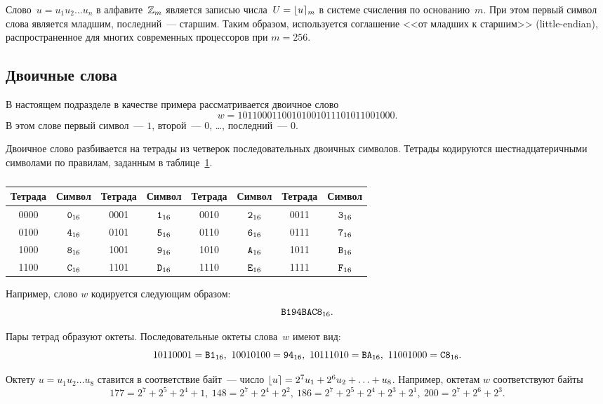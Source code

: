 Слово~$u=u_1 u_2\ldots u_n$ в алфавите~$\mathbb{Z}_m$ является записью 
числа~$U=\lfloor u\rceil_m$ в системе счисления по основанию~$m$. 
При этом первый символ слова является младшим, последний~--- старшим.
%
Таким образом, используется соглашение <<от младших к старшим>> 
(little-endian), распространенное для многих современных процессоров при 
$m=256$. 

\subsection{Двоичные слова}\label{DEFS.BinWords}

В настоящем подразделе в качестве примера рассматривается двоичное слово
$$
w=1011 0001 1001 0100 1011 1010 1100 1000.
$$
В этом слове первый символ~--- $1$, 
второй~--- $0$, \ldots, последний~--- $0$.

Двоичное слово разбивается на тетрады из четверок последовательных 
двоичных символов. 
%
Тетрады кодируются шестнадцатеричными символами по правилам, заданным в 
таблице~\ref{Table.Hex}.

\begin{table}[H]
\caption{}\label{Table.Hex}
\begin{tabular}{|c|c||c|c||c|c||c|c|}
\hline
Тетрада & Символ & Тетрада & Символ & Тетрада & Символ & Тетрада & Символ\\
\hline
0000 & $\texttt{0}_{16}$ & 0001 & $\texttt{1}_{16}$ & 
0010 & $\texttt{2}_{16}$ & 0011 & $\texttt{3}_{16}$\\
0100 & $\texttt{4}_{16}$ & 0101 & $\texttt{5}_{16}$ & 
0110 & $\texttt{6}_{16}$ & 0111 & $\texttt{7}_{16}$\\ 
1000 & $\texttt{8}_{16}$ & 1001 & $\texttt{9}_{16}$ & 
1010 & $\texttt{A}_{16}$ & 1011 & $\texttt{B}_{16}$\\ 
1100 & $\texttt{C}_{16}$ & 1101 & $\texttt{D}_{16}$ & 
1110 & $\texttt{E}_{16}$ & 1111 & $\texttt{F}_{16}$\\ 
\hline
\end{tabular}
\end{table}

Например, слово $w$ кодируется следующим образом:
$$
\texttt{B194BAC8}_{16}.
$$

Пары тетрад образуют октеты. Последовательные октеты слова~$w$ имеют вид:
$$
1011 0001=\hex{B1},\ 
1001 0100=\hex{94},\ 
1011 1010=\hex{BA},\  
1100 1000=\hex{C8}.
$$

Октету $u=u_1 u_2\ldots u_8$ ставится в соответствие байт~--- 
число $\lfloor u\rceil=2^7u_1+2^6 u_2+\ldots + u_8$. 
Например, октетам $w$ соответствуют байты
$$
177=2^7+2^5+2^4+1,\ 
148=2^7+2^4+2^2,\ 
186=2^7+2^5+2^4+2^3+2^1,\ 
200=2^7+2^6+2^3.
$$

